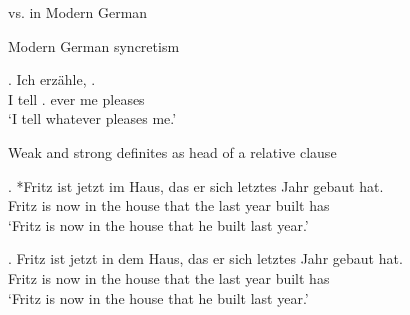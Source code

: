\begin{frame}[t,noframenumbering]{ vs.  in Modern German}
\end{frame}

\begin{frame}[t,noframenumbering]{Modern German syncretism}

  \exg. Ich erzähle,    .\\
   I tell\scsub{[acc]} . ever me pleases\scsub{[nom]}\\
   `I tell whatever pleases me.' \label{ex:mg-nom-acc-syn}

\end{frame}


\begin{frame}[t,noframenumbering]{Weak and strong definites as head of a relative clause}

  \exg. *Fritz ist jetzt im Haus, das er sich letztes Jahr gebaut hat.\\
  Fritz is now {in the} house that the  last year built has\\
  `Fritz is now in the house that he built last year.' \label{ex:mg-florian-fritz-m}

  \exg. Fritz ist jetzt in dem Haus, das er sich letztes Jahr gebaut hat.\\
  Fritz is now in the house that the  last year built has\\
  `Fritz is now in the house that he built last year.' \label{ex:mg-florian-fritz-dem}

\end{frame}


